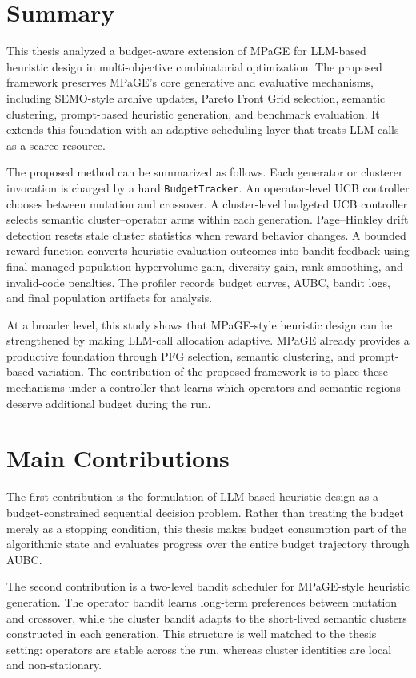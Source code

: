\documentclass[../main.tex]{subfiles}
\begin{document}
\section{Summary}

This thesis analyzed a budget-aware extension of MPaGE for LLM-based heuristic design in multi-objective combinatorial optimization. The proposed framework preserves MPaGE's core generative and evaluative mechanisms, including SEMO-style archive updates, Pareto Front Grid selection, semantic clustering, prompt-based heuristic generation, and benchmark evaluation. It extends this foundation with an adaptive scheduling layer that treats LLM calls as a scarce resource.

The proposed \bmab{} method can be summarized as follows. Each generator or clusterer invocation is charged by a hard \texttt{BudgetTracker}. An operator-level UCB controller chooses between mutation and crossover. A cluster-level budgeted UCB controller selects semantic cluster--operator arms within each generation. Page--Hinkley drift detection resets stale cluster statistics when reward behavior changes. A bounded reward function converts heuristic-evaluation outcomes into bandit feedback using final managed-population hypervolume gain, diversity gain, rank smoothing, and invalid-code penalties. The profiler records budget curves, AUBC, bandit logs, and final population artifacts for analysis.

At a broader level, this study shows that MPaGE-style heuristic design can be strengthened by making LLM-call allocation adaptive. MPaGE already provides a productive foundation through PFG selection, semantic clustering, and prompt-based variation. The contribution of the proposed framework is to place these mechanisms under a controller that learns which operators and semantic regions deserve additional budget during the run.

\section{Main Contributions}

The first contribution is the formulation of LLM-based heuristic design as a budget-constrained sequential decision problem. Rather than treating the budget merely as a stopping condition, this thesis makes budget consumption part of the algorithmic state and evaluates progress over the entire budget trajectory through AUBC.

The second contribution is a two-level bandit scheduler for MPaGE-style heuristic generation. The operator bandit learns long-term preferences between mutation and crossover, while the cluster bandit adapts to the short-lived semantic clusters constructed in each generation. This structure is well matched to the thesis setting: operators are stable across the run, whereas cluster identities are local and non-stationary.
\end{document}

